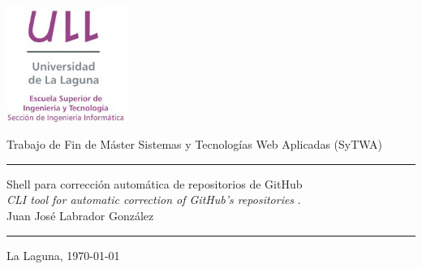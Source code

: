 \documentclass[spanish,a4paper,14pt,oneside]{extreport}
\begin{document}
\renewcommand\listtablename{Índice de Tablas}      %
\renewcommand\listfigurename{Índice de Figuras}    %


\pagestyle{empty}
\thispagestyle{empty}


\newcommand{\HRule}{\rule{\linewidth}{1mm}}
\setlength{\parindent}{0mm}
\setlength{\parskip}{0mm}


\begin{center}
	\includegraphics[width=0.3\textwidth]{images/logo_vertical}
\end{center}

\begin{center}
{\Huge Trabajo de Fin de Máster}
{\Huge Sistemas y Tecnologías Web Aplicadas (SyTWA)}
\end{center}

\HRule
\begin{flushright}
        {\Huge Shell para corrección automática de repositorios de GitHub} \\[2.5mm]
        {\Large \textit{CLI tool for automatic correction of GitHub's repositories} .} \\[5mm]
        {\Large Juan José Labrador González} \\[5mm]


\end{flushright}
\HRule
{}
\begin{center}
  \Large La Laguna, \today
\end{center}

\setlength{\parindent}{5mm}
\end{document}
